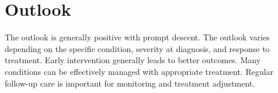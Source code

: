 \section{Outlook}
The outlook is generally positive with prompt descent. The outlook varies depending on the specific condition, severity at diagnosis, and response to treatment. Early intervention generally leads to better outcomes. Many conditions can be effectively managed with appropriate treatment. Regular follow-up care is important for monitoring and treatment adjustment.
